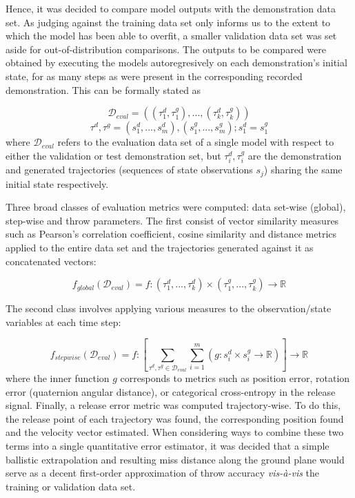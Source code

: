 \documentclass{article}
\begin{document}
Hence, it was decided to compare model outputs with the demonstration data set. As judging against the training data set only informs us to the extent to which the model has been able to overfit, a smaller validation data set was set aside for out-of-distribution comparisons. The outputs to be compared were obtained by executing the models autoregresively on each demonstration's initial state, for as many steps as were present in the corresponding recorded demonstration. This can be formally stated as

\begin{equation}
	\mathcal{D}_{eval} = \left ( (\tau^d_{1}, \tau^g_{1}), ..., (\tau^d_{k}, \tau^g_{k}) \right )
\end{equation}
\begin{equation}
	\tau^d, \tau^g = (s^d_1, ..., s^d_m), (s^g_1, ..., s^g_m); s^d_1 = s^g_1 
\end{equation}
where $\mathcal{D}_{eval}$ refers to the evaluation data set of a single model with respect to either the validation or test demonstration set, but $\tau^d_i, \tau^g_i$ are the demonstration and generated trajectories (sequences of state observations $s_j$) sharing the same initial state respectively.

Three broad classes of evaluation metrics were computed: data set-wise (global), step-wise and throw parameters. The first consist of vector similarity measures such as Pearson's correlation coefficient, cosine similarity and distance metrics applied to the entire data set and the trajectories generated against it as concatenated vectors:

\begin{equation}
	f_{global}(\mathcal{D}_{eval}) = f:(\tau^d_{1},...,\tau^d_{k}) \times (\tau^g_{1},...,\tau^g_{k}) \rightarrow \mathbb{R}
\end{equation}

The second class involves applying various measures to the observation/state variables at each time step:

\begin{equation}
	f_{stepwise}(\mathcal{D}_{eval}) = f: \left [ \sum_{\tau^d, \tau^g \in \mathcal{D}_{eval}}\sum_{i=1}^m \left ( g:s^d_i \times s^g_i \rightarrow \mathbb{R} \right ) \right ] \rightarrow \mathbb{R}
\end{equation}
where the inner function $g$ corresponds to metrics such as position error, rotation error (quaternion angular distance), or categorical cross-entropy in the release signal. Finally, a release error metric was computed trajectory-wise. To do this, the release point of each trajectory was found, the corresponding position found and the velocity vector estimated. When considering ways to combine these two terms into a single quantitative error estimator, it was decided that a simple ballistic extrapolation and resulting miss distance along the ground plane would serve as a decent first-order approximation of throw accuracy \emph{vis-à-vis} the training or validation data set.
\end{document}

